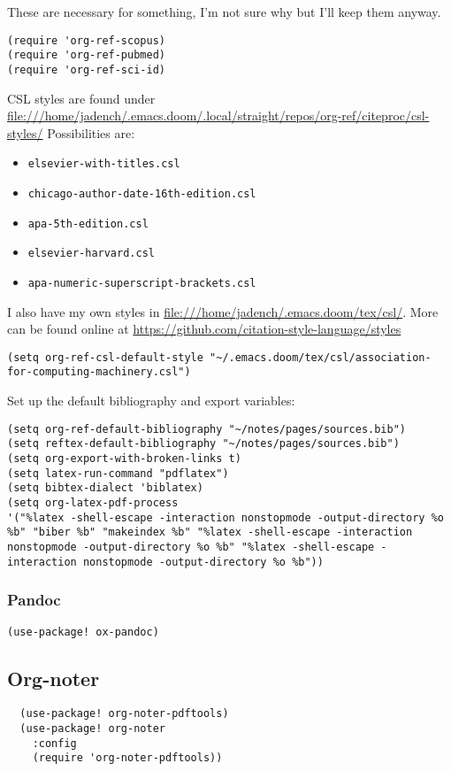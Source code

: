\documentclass[11pt]{article}
\begin{document}
These are necessary for something, I'm not sure why but I'll keep them anyway.
\begin{verbatim}
(require 'org-ref-scopus)
(require 'org-ref-pubmed)
(require 'org-ref-sci-id)
\end{verbatim}

CSL styles are found under \url{file:///home/jadench/.emacs.doom/.local/straight/repos/org-ref/citeproc/csl-styles/}
Possibilities are: 
\begin{itemize}
\item \texttt{elsevier-with-titles.csl}
\item \texttt{chicago-author-date-16th-edition.csl}
\item \texttt{apa-5th-edition.csl}
\item \texttt{elsevier-harvard.csl}
\item \texttt{apa-numeric-superscript-brackets.csl}
\end{itemize}

I also have my own styles in \url{file:///home/jadench/.emacs.doom/tex/csl/}. More can be found online at \url{https://github.com/citation-style-language/styles}
\begin{verbatim}
(setq org-ref-csl-default-style "~/.emacs.doom/tex/csl/association-for-computing-machinery.csl")
\end{verbatim}

Set up the default bibliography and export variables:
\begin{verbatim}
(setq org-ref-default-bibliography "~/notes/pages/sources.bib")
(setq reftex-default-bibliography "~/notes/pages/sources.bib")
(setq org-export-with-broken-links t)
(setq latex-run-command "pdflatex")
(setq bibtex-dialect 'biblatex)
(setq org-latex-pdf-process
'("%latex -shell-escape -interaction nonstopmode -output-directory %o %b" "biber %b" "makeindex %b" "%latex -shell-escape -interaction nonstopmode -output-directory %o %b" "%latex -shell-escape -interaction nonstopmode -output-directory %o %b"))
\end{verbatim}

\subsubsection{Pandoc}
\label{sec:orgaf0b0f4}
\begin{verbatim}
(use-package! ox-pandoc)
\end{verbatim}

\subsection{Org-noter}
\label{sec:org48433a8}
\begin{verbatim}
  (use-package! org-noter-pdftools)
  (use-package! org-noter
    :config
    (require 'org-noter-pdftools))
\end{verbatim}
\end{document}
